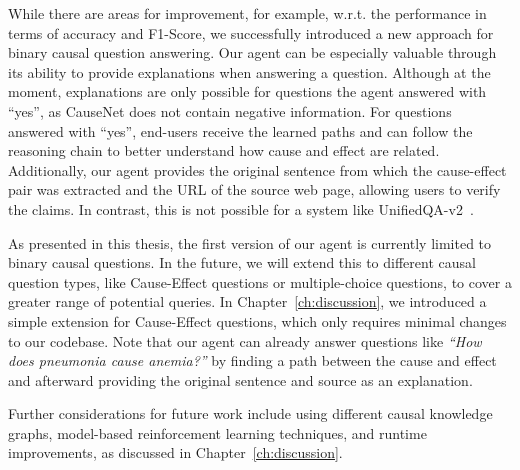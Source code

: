 While there are areas for improvement, for example, w.r.t. the performance in terms of accuracy and F1-Score, we successfully introduced a new approach for
binary causal question answering.
Our agent can be especially valuable through its ability to provide explanations when answering a question.
Although at the moment, explanations are only possible for questions the agent answered with ``yes'', as CauseNet does not contain negative information.
For questions answered with ``yes'', end-users receive the learned paths and can follow the reasoning chain to better understand how cause and effect are related.
Additionally, our agent provides the original sentence from which the cause-effect pair was extracted and the URL of the source web page, allowing users to verify the claims.
In contrast, this is not possible for a system like UnifiedQA-v2~\cite{Khashabi2020UnifiedQA, Khashabi2022UnifiedQA2}.

As presented in this thesis, the first version of our agent is currently limited to binary causal questions.
In the future, we will extend this to different causal question types, like Cause-Effect questions or multiple-choice questions, to cover a greater range 
of potential queries. In Chapter~\ref{ch:discussion}, we introduced a simple extension for Cause-Effect questions, which only requires minimal changes to our codebase.
Note that our agent can already answer questions like \textit{``How does pneumonia cause anemia?''} by finding a path between the cause and effect and afterward providing the original sentence and source as an explanation.

Further considerations for future work include using different causal knowledge graphs, model-based reinforcement learning techniques, and runtime improvements, as discussed in Chapter~\ref{ch:discussion}.